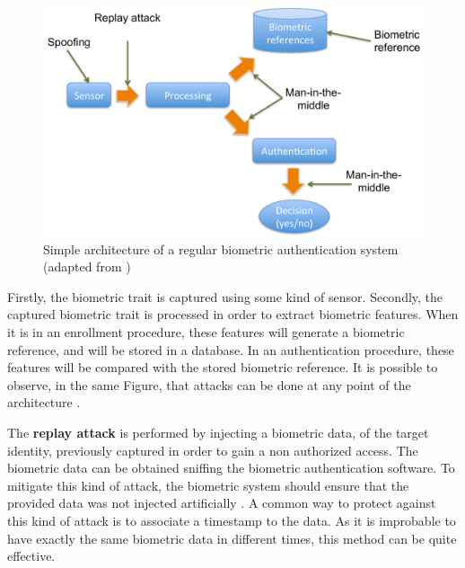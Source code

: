 \begin{figure}[!htb]
\begin{center}
\includegraphics [width=14cm] {images/diagram_attacks.pdf}
\caption[Simple architecture of a regular biometric authentication system]{Simple architecture of a regular biometric authentication system (adapted from \citep{xiao2005security})} \label{fig:diagram_attacks}
\end{center}
\end{figure}

Firstly, the biometric trait is captured using some kind of sensor. Secondly, the captured biometric trait is processed in order to extract biometric features. When it is in an enrollment procedure, these features will generate a biometric reference, and will be stored in a database. In an authentication procedure, these features will be compared with the stored biometric reference. It is possible to observe, in the same Figure, that attacks can be done at any point of the architecture \citep{xiao2005security}. 


The \textbf{replay attack} is performed by injecting a biometric data, of the target identity, previously captured in order to gain a non authorized access. The biometric data can be obtained sniffing the biometric authentication software. To mitigate this kind of attack, the biometric system should ensure that the provided data was not injected artificially \citep{xiao2005security}. A common way to protect against this kind of attack is to associate a timestamp to the data. As it is improbable to have exactly the same biometric data in different times, this method can be quite effective.

